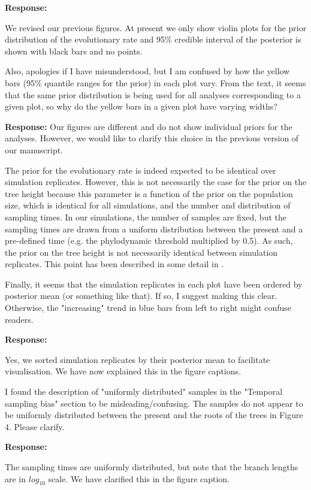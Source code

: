 \documentclass[11pt]{article}
\begin{document}
{\color{blue}
\textbf{Response:}

We revised our previous figures. At present we only show violin plots for the prior distribution of the evolutionary rate and 95\% credible interval of the posterior is shown with black bars and no points. 
}

Also, apologies if I have misunderstood, but I am confused by how the yellow bars (95\% quantile ranges for the prior) in each plot vary. From the text, it seems that the same prior distribution is being used for all analyses corresponding to a given plot, so why do the yellow bars in a given plot have varying widths? 

{\color{blue}
\textbf{Response:}
Our figures are different and do not show individual priors for the analyses. However, we would like to clarify this choice in the previous version of our manuscript. 

The prior for the evolutionary rate is indeed expected to be identical over simulation replicates. However, this is not necessarily the case for the prior on the tree height because this parameter is a function of the prior on the population size, which is identical for all simulations, and the number and distribution of sampling times. In our simulations, the number of samples are fixed, but the sampling times are drawn from a uniform distribution between the present and a pre-defined time (e.g. the phylodynamic threshold multiplied by 0.5). As such, the prior on the tree height is not necessarily identical between simulation replicates. This point has been described in some detail in \cite{boskova2014inference}.
}

Finally, it seems that the simulation replicates in each plot have been ordered by posterior mean (or something like that). If so, I suggest making this clear. Otherwise, the "increasing" trend in blue bars from left to right might confuse readers.

{\color{blue}
\textbf{Response:}

Yes, we sorted simulation replicates by their posterior mean to facilitate visualisation. We have now explained this in the figure captions. 
}

I found the description of "uniformly distributed" samples in the "Temporal sampling bias" section to be misleading/confusing. The samples do not appear to be uniformly distributed between the present and the roots of the trees in Figure 4. Please clarify.


{\color{blue}
\textbf{Response:}

The sampling times are uniformly distributed, but note that the branch lengths are in $log_{10}$ scale. We have clarified this in the figure caption.}
\end{document}
